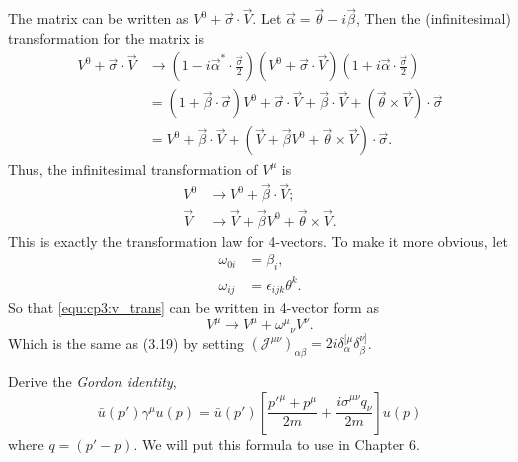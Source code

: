 \begin{problembody}
    \item The matrix can be written as $V^0 + \vec{\sigma}\cdot\vec{V}$. Let $\vec{\alpha} = \vec{\theta} - i\vec{\beta}$,
    Then the (infinitesimal) transformation for the matrix is
    \begin{align*}
        V^0 + \vec{\sigma}\cdot\vec{V} & \to 
        \left(1 - i\vec{\alpha}^\ast\cdot\frac{\vec{\sigma}}{2}\right)
        \left(V^0 + \vec{\sigma}\cdot\vec{V}\right)
        \left(1 + i\vec{\alpha}\cdot\frac{\vec{\sigma}}{2}\right)\\
        & = \left(1 + \vec{\beta}\cdot\vec{\sigma}\right) V^0 + \vec{\sigma}\cdot\vec{V} + \vec{\beta}\cdot\vec{V} + \left(\vec{\theta}\times\vec{V}\right)\cdot\vec{\sigma}\\
        & = V^0 + \vec{\beta}\cdot\vec{V} + \left(\vec{V} + \vec{\beta}V^0 + \vec{\theta}\times\vec{V}\right)\cdot\vec{\sigma}.
    \end{align*}
    Thus, the infinitesimal transformation of $V^\mu$ is
    \begin{subequations}\label{equ:cp3:v_trans}
        \begin{align}
            V^0 & \to V^0 + \vec{\beta}\cdot\vec{V};\\
            \vec{V} & \to \vec{V} + \vec{\beta}V^0 + \vec{\theta}\times\vec{V}.
        \end{align}
    \end{subequations}
    This is exactly the transformation law for 4-vectors. To make it more obvious, let
    \begin{subequations}\label{equ:cp3:omega_def}
        \begin{align}
            \omega_{0i} & = \beta_i, \\
            \omega_{ij} & = \epsilon_{ijk} \theta^k.
        \end{align}
    \end{subequations}
    So that \eqref{equ:cp3:v_trans} can be written in 4-vector form as
    \begin{equation*}
        V^\mu \to V^\mu + \omega^\mu{}_\nu V^\nu.
    \end{equation*}
    Which is the same as (3.19) by setting $(\mathcal{J}^{\mu\nu})_{\alpha\beta} = 2i \delta^{[\mu}_\alpha \delta^{\nu]}_\beta$.
\end{problembody}

\problem Derive the \textit{Gordon identity},
\begin{equation}\label{equ:cp3:gordon_identity}
    \bar{u}(p')\gamma^\mu u(p) = \bar{u}(p') \left[\frac{p'^{\mu} + p^\mu}{2m} + \frac{i\sigma^{\mu\nu}q_\nu}{2m}\right] u(p)
\end{equation}
where $q = (p' - p)$. We will put this formula to use in Chapter 6.

